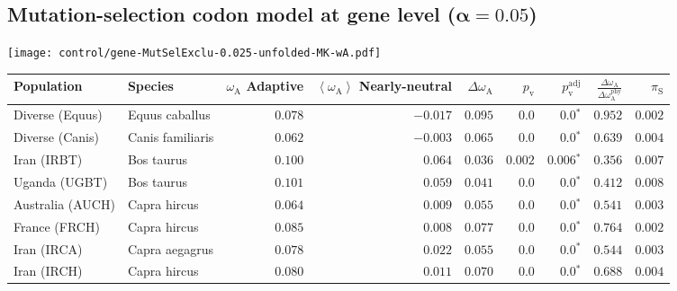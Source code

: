 \subsection{Mutation-selection codon model at gene level ($\bm{\alpha=0.05}$)}
\begin{center}
    \texttt{[image: control/gene-MutSelExclu-0.025-unfolded-MK-wA.pdf]}
    \begin{adjustbox}{width = 1\textwidth}
        \begin{tabular}{|l|l|r|r|r|r|r|r|r|}
            \toprule
            Population & Species & \specialcell{$\omega_{\mathrm{A}}$ \\ Adaptive}                & \specialcell{$\left< \omega_{\mathrm{A}} \right>$ \\ Nearly-neutral}                & $\Delta \omega_{\mathrm{A}} $    & $p_{\mathrm{v}}$ & $p_{\mathrm{v}}^{\mathrm{adj}}$  & $\frac{\Delta\omega_{\mathrm{A}}}{\Delta\omega_{\mathrm{A}}^{\mathrm{phy}}}$ & $\pi_{\textrm{S}}$    \\
            \midrule
            Diverse (Equus)                    & Equus caballus          & $ 0.078$ & $-0.017$  & $ 0.095$ & $0.0$ & $\bm{0.0{^*}}$ & $ 0.952$ & $ 0.002$ \\
            Diverse (Canis)                  & Canis familiaris          & $ 0.062$ & $-0.003$  & $ 0.065$ & $0.0$    & $\bm{0.0{^*}}$    & $ 0.639$ & $ 0.004$ \\
            Iran (IRBT)               & Bos taurus        & $ 0.100$ & $ 0.064$  & $ 0.036$ & $ 0.002$    & $\bm{ 0.006{^*}}$    & $ 0.356$ & $ 0.007$ \\
            Uganda (UGBT)                  & Bos taurus        & $ 0.101$ & $ 0.059$  & $ 0.041$ & $0.0$    & $\bm{0.0{^*}}$    & $ 0.412$ & $ 0.008$ \\
            Australia (AUCH)                    & Capra hircus      & $ 0.064$ & $ 0.009$  & $ 0.055$ & $0.0$    & $\bm{0.0{^*}}$    & $ 0.541$ & $ 0.003$ \\
            France (FRCH)                    & Capra hircus        & $ 0.085$ & $ 0.008$  & $ 0.077$ & $0.0$    & $\bm{0.0{^*}}$    & $ 0.764$ & $ 0.002$ \\
            Iran (IRCA)                   & Capra aegagrus        & $ 0.078$ & $ 0.022$  & $ 0.055$ & $0.0$    & $\bm{0.0{^*}}$    & $ 0.544$ & $ 0.003$ \\
            Iran (IRCH)                 & Capra hircus        & $ 0.080$ & $ 0.011$  & $ 0.070$ & $0.0$    & $\bm{0.0{^*}}$    & $ 0.688$ & $ 0.004$ \\

\end{tabular}
\end{adjustbox}
\end{center}
